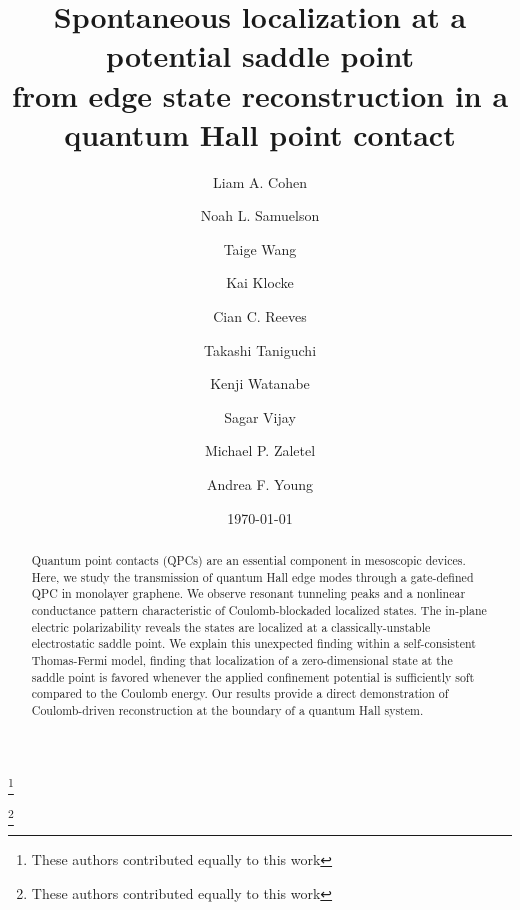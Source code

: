 \documentclass[reprint,prl,aps,superscriptaddress]{revtex4-1}
\title@column\titleblock@produce
\makeatletter
\def\maketitle{
\@author@finish
\title@column\titleblock@produce
\suppressfloats[t]}
\makeatother
\begin{document}
\title{Spontaneous localization at a potential saddle point \\ from edge state reconstruction in a quantum Hall point contact}

\author{Liam A. Cohen}
\thanks{These authors contributed equally to this work}
\author{Noah L. Samuelson}
\thanks{These authors contributed equally to this work}

\author{Taige Wang}
\author{Kai Klocke}
\author{Cian C. Reeves}
\author{Takashi Taniguchi}
\author{Kenji Watanabe}
\author{Sagar Vijay}
\author{Michael P. Zaletel}
\author{Andrea F. Young}

\date{\today}

\begin{abstract}
Quantum point contacts (QPCs) are an essential component in mesoscopic devices. Here, we study the transmission of quantum Hall edge modes through a gate-defined QPC in monolayer graphene. We observe resonant tunneling peaks and a nonlinear conductance pattern characteristic of Coulomb-blockaded localized states. 
The in-plane electric polarizability reveals the states are localized at a classically-unstable electrostatic saddle point. We explain this unexpected finding within a self-consistent Thomas-Fermi model, finding that localization of a zero-dimensional state at the saddle point is favored whenever the applied confinement potential is sufficiently soft compared to the Coulomb energy. Our results provide a direct demonstration of Coulomb-driven reconstruction at the boundary of a quantum Hall system.
\end{abstract}
\maketitle
\end{document}
